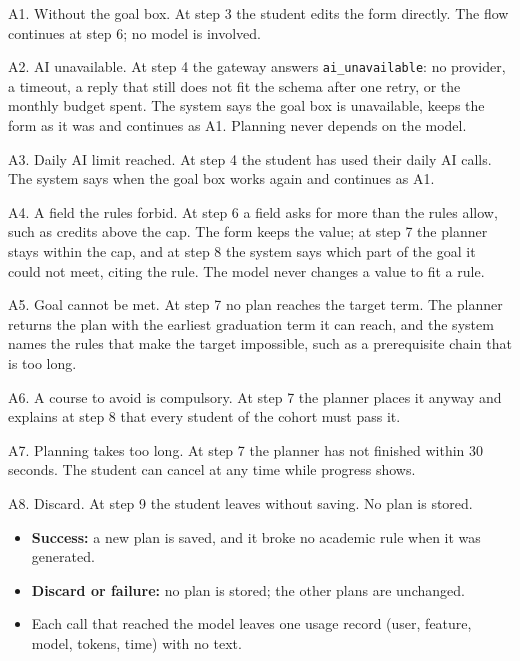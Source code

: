 \begin{altflows}
  \item[A1. Without the goal box.] At step 3 the student edits the form directly. The flow continues at step 6; no model is
        involved.
  \item[A2. AI unavailable.] At step 4 the gateway answers \texttt{ai\_unavailable}: no provider, a timeout, a reply that
        still does not fit the schema after one retry, or the monthly budget spent. The system says the goal box is
        unavailable, keeps the form as it was and continues as A1. Planning never depends on the model.
  \item[A3. Daily AI limit reached.] At step 4 the student has used their daily AI calls. The system says when the goal box
        works again and continues as A1.
  \item[A4. A field the rules forbid.] At step 6 a field asks for more than the rules allow, such as credits above the
        cap. The form keeps the value; at step 7 the planner stays within the cap, and at step 8 the system says which part
        of the goal it could not meet, citing the rule. The model never changes a value to fit a rule.
  \item[A5. Goal cannot be met.] At step 7 no plan reaches the target term. The planner returns the plan with the earliest
        graduation term it can reach, and the system names the rules that make the target impossible, such as a
        prerequisite chain that is too long.
  \item[A6. A course to avoid is compulsory.] At step 7 the planner places it anyway and explains at step 8 that every
        student of the cohort must pass it.
  \item[A7. Planning takes too long.] At step 7 the planner has not finished within 30 seconds. The student can cancel at
        any time while progress shows.
  \item[A8. Discard.] At step 9 the student leaves without saving. No plan is stored.
\end{altflows}

\begin{itemize}
  \item \textbf{Success:} a new plan is saved, and it broke no academic rule when it was generated.
  \item \textbf{Discard or failure:} no plan is stored; the other plans are unchanged.
  \item Each call that reached the model leaves one usage record (user, feature, model, tokens, time) with no text.
\end{itemize}

